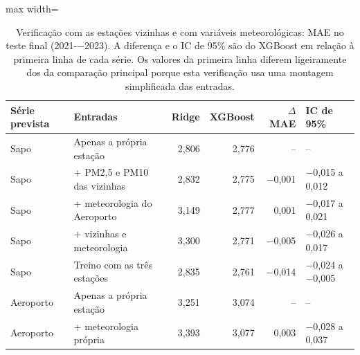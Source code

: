 \begin{table}[!htbp]
    \centering
    \caption[Verificação com as estações vizinhas e com variáveis meteorológicas]{Verificação com as estações vizinhas e com variáveis meteorológicas: MAE no teste final (2021-$-$2023). A diferença e o IC de 95\% são do XGBoost em relação à primeira linha de cada série. Os valores da primeira linha diferem ligeiramente dos da comparação principal porque esta verificação usa uma montagem simplificada das entradas.}
    \label{tab:contexto_holdout}
    \small
    \begin{adjustbox}{max width=\textwidth}
    \begin{tabular}{llrrrl}
        \toprule
        Série prevista & Entradas & Ridge & XGBoost & $\Delta$ MAE & IC de 95\% \\
        \midrule
        Sapo & Apenas a própria estação & 2,806 & 2,776 & -- & -- \\
        Sapo & + PM2,5 e PM10 das vizinhas & 2,832 & 2,775 & $-$0,001 & $-$0,015 a 0,012 \\
        Sapo & + meteorologia do Aeroporto & 3,149 & 2,777 & 0,001 & $-$0,017 a 0,021 \\
        Sapo & + vizinhas e meteorologia & 3,300 & 2,771 & $-$0,005 & $-$0,026 a 0,017 \\
        Sapo & Treino com as três estações & 2,835 & 2,761 & $-$0,014 & $-$0,024 a $-$0,005 \\
        \midrule
        Aeroporto & Apenas a própria estação & 3,251 & 3,074 & -- & -- \\
        Aeroporto & + meteorologia própria & 3,393 & 3,077 & 0,003 & $-$0,028 a 0,037 \\
        \bottomrule
    \end{tabular}
    \end{adjustbox}
\end{table}

